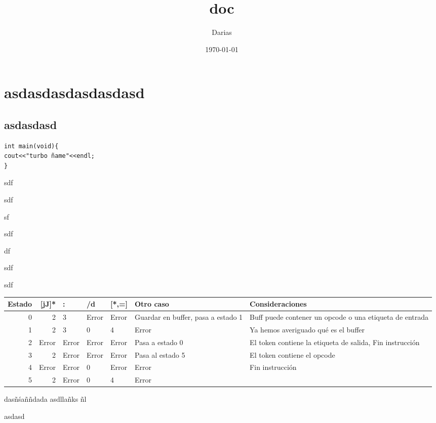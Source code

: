 \documentclass[11pt]{article}
\author{Darias}
\date{\today}
\title{doc}
\begin{document}
\maketitle
\tableofcontents

\section{asdasdasdasdasdasd}
\label{sec-1}

\subsection{asdasdasd}
\label{sec-1-1}


\begin{verbatim}
int main(void){
cout<<"turbo ñame"<<endl;
}
\end{verbatim}
sdf

sdf

sf

sdf

df

sdf

sdf



\begin{center}
\begin{tabular}{rrlllll}
Estado & [jJ]* & : & /d & [*,=] & Otro caso & Consideraciones\\
\hline
0 & 2 & 3 & Error & Error & Guardar en buffer, pasa a estado 1 & Buff puede contener un opcode o una etiqueta de entrada\\
1 & 2 & 3 & 0 & 4 & Error & Ya hemos averiguado qué es el buffer\\
2 & Error & Error & Error & Error & Pasa a estado 0 & El token contiene la etiqueta de salida, Fin instrucción\\
3 & 2 & Error & Error & Error & Pasa al estado 5 & El token contiene el opcode\\
4 & Error & Error & 0 & Error & Error & Fin instrucción\\
5 & 2 & Error & 0 & 4 & Error & \\
\end{tabular}
\end{center}



dasñśaññdada asdllañks ñl

asdasd
\end{document}
